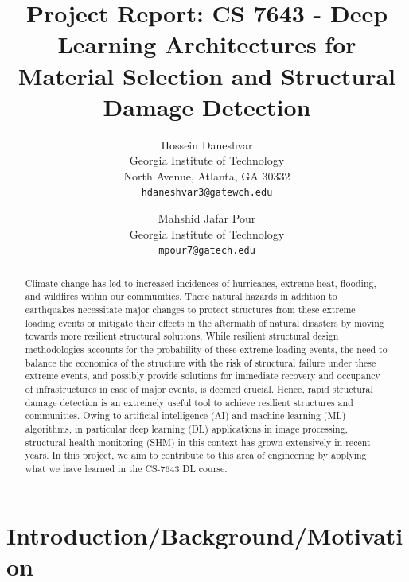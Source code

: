 \documentclass[10pt,twocolumn,letterpaper]{article}
\begin{document}
\title{Project Report: CS 7643 - Deep Learning Architectures for Material Selection and Structural Damage Detection}

\author{Hossein Daneshvar\\
Georgia Institute of Technology\\
North Avenue, Atlanta, GA 30332\\
{\tt\small hdaneshvar3@gatewch.edu}
\and
Mahshid Jafar Pour\\
Georgia Institute of Technology\\
{\tt\small mpour7@gatech.edu}
}

\maketitle

\begin{abstract}
   Climate change has led to increased incidences of hurricanes, extreme heat, flooding, and wildfires within our communities. These natural hazards in addition to earthquakes necessitate major changes to protect structures from these extreme loading events or mitigate their effects in the aftermath of natural disasters by moving towards more resilient structural solutions. While resilient structural design methodologies accounts for the probability of these extreme loading events, the need to balance the economics of the structure with the risk of structural failure under these extreme events, and possibly provide solutions for immediate recovery and occupancy of infrastructures in case of major events, is deemed crucial. Hence, rapid structural damage detection is an extremely useful tool to achieve resilient structures and communities. Owing to artificial intelligence (AI) and machine learning (ML) algorithms, in particular deep learning (DL) applications in image processing, structural health monitoring (SHM) in this context has grown extensively in recent years. In this project, we aim to contribute to this area of engineering by applying what we have learned in the CS-7643 DL course.  
\end{abstract}

\section{Introduction/Background/Motivation}
\end{document}
